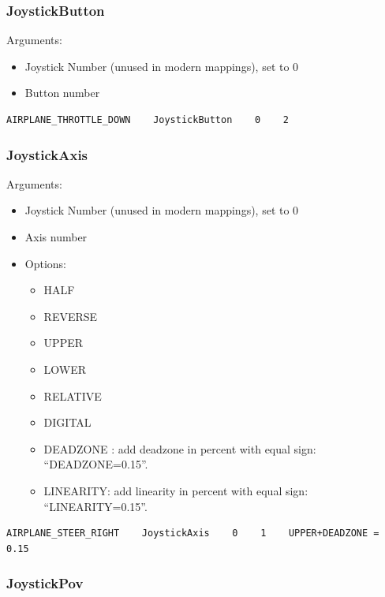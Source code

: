 \hypertarget{joystickbutton}{%
\subsubsection{JoystickButton}\label{joystickbutton}}

Arguments:

\begin{itemize}
\tightlist
\item
  Joystick Number (unused in modern mappings), set to 0
\item
  Button number
\end{itemize}

\begin{verbatim}
AIRPLANE_THROTTLE_DOWN    JoystickButton    0    2
\end{verbatim}

\hypertarget{joystickaxis}{%
\subsubsection{JoystickAxis}\label{joystickaxis}}

Arguments:

\begin{itemize}
\tightlist
\item
  Joystick Number (unused in modern mappings), set to 0
\item
  Axis number
\item
  Options:

  \begin{itemize}
  \tightlist
  \item
    HALF
  \item
    REVERSE
  \item
    UPPER
  \item
    LOWER
  \item
    RELATIVE
  \item
    DIGITAL
  \item
    DEADZONE : add deadzone in percent with equal sign:
    ``DEADZONE=0.15''.
  \item
    LINEARITY: add linearity in percent with equal sign:
    ``LINEARITY=0.15''.
  \end{itemize}
\end{itemize}

\begin{verbatim}
AIRPLANE_STEER_RIGHT    JoystickAxis    0    1    UPPER+DEADZONE = 0.15
\end{verbatim}

\hypertarget{joystickpov}{%
\subsubsection{JoystickPov}\label{joystickpov}}


